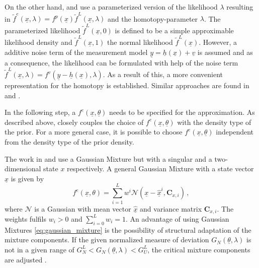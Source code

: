 \documentclass[a4paper]{IEEEtran}
\begin{document}
On the other hand, \cite{hanebeck2003b} and \cite{hanebeck2003} use a parameterized version of the likelihood $\lambda$ resulting in $\tilde{f}^{e}(\underline{x}, \lambda)=f^{p}(\underline{x})\tilde{f}^{L}(\underline{x}, \lambda)$ and the homotopy-parameter $\lambda$. 
The parameterized likelihood $\tilde{f}^{L}(\underline{x}, 0)$ is defined to be a simple approximable likelihood density and $\tilde{f}^{L}(\underline{x}, 1)$ the normal likelihood $\tilde{f}^{L}(\underline{x})$. However, a additive noise term of the measurement model $\underline{y}=\underline{h}(\underline{x}) + \underline{v}$ is assumed and as a consequence,
the likelihood can be formulated with help of the noise term $\tilde{f}^{L}(\underline{x}, \lambda) = f^{v}(\underline{y}-\underline{h}(\underline{x}), \lambda)$. As a result of this, a more convenient representation for the homotopy is established. Similar approaches are found in \cite{hanebeck2012a} and \cite{hanebeck}.

In the following step, a $f^e(\underline{x}, \underline{\theta})$ needs to be specified for the approximation. As described above, \cite{hagmar2011} closely couples the choice of $f^e(\underline{x}, \underline{\theta})$ with the density type of the prior.
For a more general case, it is possible to choose $f^e(\underline{x}, \underline{\theta})$ independent from the density type of the prior density. 

The work in \cite{hanebeck2003} and \cite{hanebeck2003b} use a Gaussian Mixture but with a singular and  a two-dimensional state $x$ respectively. A general Gaussian Mixture with a state vector $\underline{x}$ is given by
\begin{equation}
    f^{e}(\underline{x}, \theta) = \sum^{L}_{i=1} w^{i} \mathcal{N}(\underline{x}-\underline{\hat{x}}^{i}, \textbf{C}_{x, i}) \,,
    \label{eq:gaussian_mixture}
\end{equation}
where $\mathcal{N}$ is a Gaussian with mean vector $\underline{\hat{x}}$ and variance matrix $\textbf{C}_{x, i}$. The weights fulfils $w_{i} > 0$ and $\sum^{L}_{i=0} w_{i} = 1$.
An advantage of using Gaussian Mixtures \eqref{eq:gaussian_mixture} is the possibility of structural adaptation of the mixture components. If the given normalized measure of deviation $G_{N}(\underline{\theta}, \lambda)$ is not in a given range of $G^{L}_{N} < G_{N}(\underline{\theta}, \lambda) < G^{L}_{U}$, 
the critical mixture components are adjusted \cite{hanebeck2003}.
\end{document}
